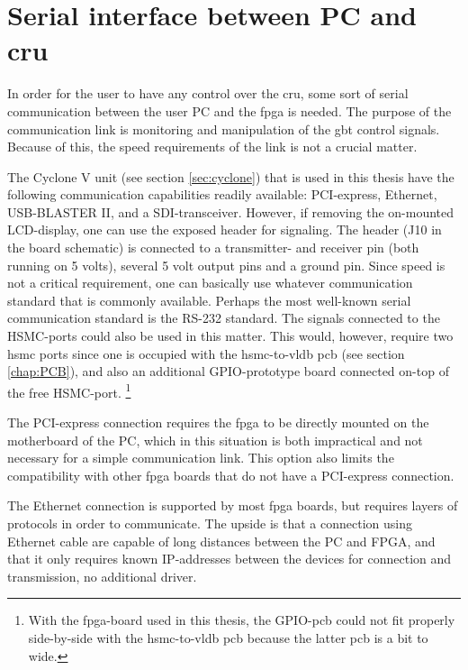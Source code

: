 \documentclass[main.tex]{subfiles}
\begin{document}
\chapter{Serial interface between PC and \gls{cru}}

In order for the user to have any control over the \gls{cru}, some sort of serial communication between the user PC and the \gls{fpga} is needed. The purpose of the communication link is monitoring and manipulation of the \gls{gbt} control signals. Because of this, the speed requirements of the link is not a crucial matter. 

The Cyclone V unit (see section \ref{sec:cyclone}) that is used in this thesis have the following communication capabilities readily available: PCI-express, Ethernet, USB-BLASTER II, and a SDI-transceiver. However, if removing the on-mounted LCD-display, one can use the exposed header for signaling. The header (J10 in the board schematic) is connected to a transmitter- and receiver pin (both running on 5 volts), several 5 volt output pins and a ground pin. Since speed is not a critical requirement, one can basically use whatever communication standard that is commonly available. Perhaps the most well-known serial communication standard is the RS-232 standard. The signals connected to the HSMC-ports could also be used in this matter. This would, however, require two \gls{hsmc} ports since one is occupied with the \acrshort{hsmc}-to-\acrshort{vldb} \acrshort{pcb} (see section \ref{chap:PCB}), and also an additional GPIO-prototype board connected on-top of the free HSMC-port. \footnote{With the \gls{fpga}-board used in this thesis, the GPIO-\gls{pcb} could not fit properly side-by-side with the \acrshort{hsmc}-to-\acrshort{vldb} \acrshort{pcb} because the latter \gls{pcb} is a bit to wide.}

The PCI-express connection requires the fpga to be directly mounted on the motherboard of the PC, which in this situation is both impractical and not necessary for a simple communication link. This option also limits the compatibility with other \gls{fpga} boards that do not have a PCI-express connection.

The Ethernet connection is supported by most \gls{fpga} boards, but requires layers of protocols in order to communicate. The upside is that a connection using Ethernet cable are capable of long distances between the PC and FPGA, and that it only requires known IP-addresses between the devices for connection and transmission, no additional driver. 
\end{document}
